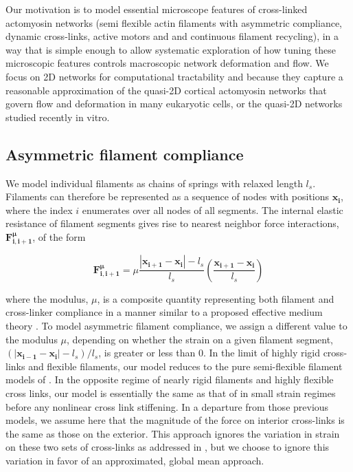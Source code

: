Our motivation is to model essential microscope features of cross-linked actomyosin networks (semi flexible actin filaments with asymmetric compliance, dynamic cross-links, active motors and and continuous filament recycling), in a way that is simple enough to allow systematic exploration of how tuning these microscopic features controls macroscopic network deformation and flow. We focus on 2D networks for computational tractability and because they capture a reasonable approximation of the quasi-2D cortical actomyosin networks that govern flow and deformation in many eukaryotic cells\cite{cellmech_flows, salbreuxbphs}, or the quasi-2D networks studied recently in vitro\cite{rheo_2D1,rheo_2D2}.


\subsection{Asymmetric filament compliance}
We model individual filaments as chains of springs with relaxed length $l_s$.  Filaments can therefore be represented as a sequence of nodes with positions $\mathbf{x_i}$, where the index $i$ enumerates over all nodes of all segments.  The internal elastic resistance of filament segments gives rise to nearest neighbor force interactions, $\mathbf{F^{\mu}_{i,i+1}}$, of the form

\begin{equation}
\label{eqn:spring}
\mathbf{F^{\mu}_{i,i+1}} = \mu\frac{|\mathbf{x_{i+1}}-\mathbf{x_i}|-l_s}{l_s}\left ( \frac{\mathbf{x_{i+1}}-\mathbf{x_i}}{l_s}\right )
\end{equation}


where the modulus, $\mu$, is a composite quantity representing both filament and cross-linker compliance in a manner similar to a proposed effective medium theory \cite{theo_crosslinknonlinear}. To model asymmetric filament compliance, we assign a different value to the modulus $\mu$,  depending on whether the strain on a given filament segment, $(|\mathbf{x_{i-1}}-\mathbf{x_i}|-l_s)/l_s$, is greater or less than 0. In the limit of highly rigid cross-links and flexible filaments, our model reduces to the pure semi-flexible filament models of \cite{theo_hlm,theo_hlm2}. In the opposite regime of nearly rigid filaments and highly flexible cross links, our model is essentially the same as that of \cite{theo_crosslinknonlinear} in small strain regimes before any nonlinear cross link stiffening. In a departure from those previous models, we assume here that the magnitude of the force on interior cross-links is the same as those on the exterior. This approach ignores the variation in strain on these two sets of cross-links as addressed in \cite{theo_crosslinknonlinear}, but we choose to ignore this variation in favor of an approximated, global mean approach. 

